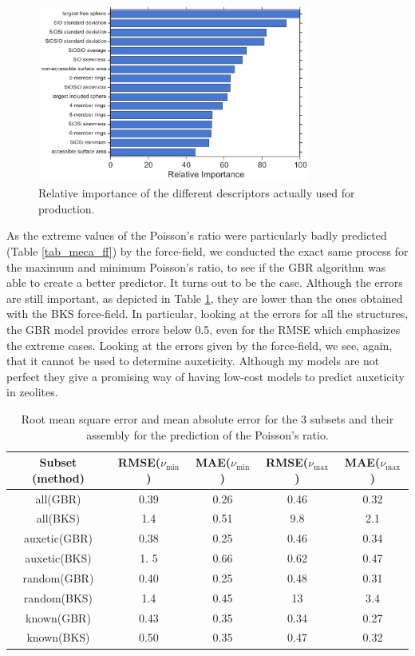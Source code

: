 \documentclass[journal=jacsat,manuscript=article]{achemso}
\begin{document}
\begin{figure}[ht!]\centering
\includegraphics[clip,trim=0cm 0cm 0cm 0cm,width=0.8\textwidth]{zeolite_study_9}
\caption{Relative importance of the different descriptors actually used for production.
\label{GBR_import}}
\end{figure}
			
As the extreme values of the Poisson's ratio were particularly badly predicted (Table \ref{tab_meca_ff}) by the force-field, we conducted the exact same process for the maximum and minimum Poisson's ratio, to see if the GBR algorithm was able to create a better predictor. It turns out to be the case. Although the errors are still important, as depicted in Table \ref{numax_gbr}, they are lower than the ones obtained with the BKS force-field. In particular, looking at the errors for all the structures, the GBR model provides errors below 0.5, even for the RMSE which emphasizes the extreme cases. Looking at the errors given by the force-field, we see, again, that it cannot be used to determine auxeticity. Although my models are not perfect they give a promising way of having low-cost models to predict auxeticity in zeolites.
			
\begin{table}[ht!]
\centering
\begin{tabular}{|c|c|c|c|c|}
\hline
Subset (method) & RMSE($\nu_{\min}$) & MAE($\nu_{\min}$) & RMSE($\nu_{\max}$) & MAE($\nu_{\max}$)\\
\hline
all(GBR)  & 0.39 & 0.26 & 0.46 & 0.32      \\
all(BKS)& 1.4 & 0.51 & 9.8 & 2.1  \\
\hline
auxetic(GBR)  & 0.38  & 0.25   & 0.46 & 0.34  \\
auxetic(BKS)  & 1. 5 & 0.66  & 0.62 & 0.47    \\
\hline
random(GBR)  & 0.40  & 0.25    & 0.48 & 0.31    \\
random(BKS)  & 1.4 & 0.45    & 13 & 3.4   \\
\hline
known(GBR)   & 0.43   & 0.35   & 0.34 & 0.27     \\
known(BKS)   & 0.50  & 0.35   & 0.47 & 0.32    \\
\hline
\end{tabular}
\caption{\label{numax_gbr} Root mean square error and mean absolute error for the 3 subsets and their assembly for the prediction of the Poisson's ratio.}
\end{table}
\end{document}
